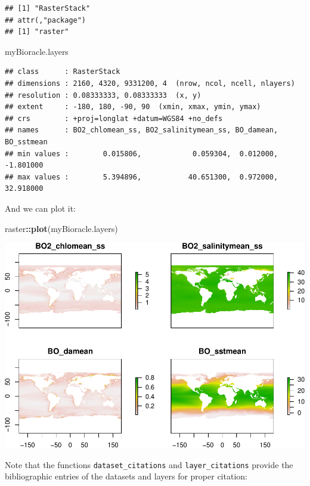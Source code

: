\documentclass[
]{book}
\newenvironment{Shaded}{\begin{snugshade}}{\end{snugshade}}
\newcommand{\FunctionTok}[1]{\textcolor[rgb]{0.13,0.29,0.53}{\textbf{#1}}}
\newcommand{\NormalTok}[1]{#1}
\newcommand{\SpecialCharTok}[1]{\textcolor[rgb]{0.81,0.36,0.00}{\textbf{#1}}}
\begin{document}
\begin{verbatim}
## [1] "RasterStack"
## attr(,"package")
## [1] "raster"
\end{verbatim}

\begin{Shaded}
\begin{Highlighting}[]
\NormalTok{myBioracle.layers}
\end{Highlighting}
\end{Shaded}

\begin{verbatim}
## class      : RasterStack 
## dimensions : 2160, 4320, 9331200, 4  (nrow, ncol, ncell, nlayers)
## resolution : 0.08333333, 0.08333333  (x, y)
## extent     : -180, 180, -90, 90  (xmin, xmax, ymin, ymax)
## crs        : +proj=longlat +datum=WGS84 +no_defs 
## names      : BO2_chlomean_ss, BO2_salinitymean_ss, BO_damean, BO_sstmean 
## min values :        0.015806,            0.059304,  0.012000,  -1.801000 
## max values :        5.394896,           40.651300,  0.972000,  32.918000
\end{verbatim}

And we can plot it:

\begin{Shaded}
\begin{Highlighting}[]
\NormalTok{raster}\SpecialCharTok{::}\FunctionTok{plot}\NormalTok{(myBioracle.layers)}
\end{Highlighting}
\end{Shaded}

\includegraphics{_main_files/figure-latex/unnamed-chunk-35-1.pdf}

Note that the functions \texttt{dataset\_citations} and \texttt{layer\_citations} provide the bibliographic entries of the datasets and layers for proper citation:
\end{document}
